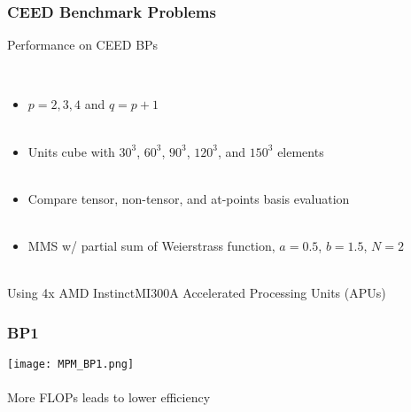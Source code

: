 \documentclass{beamer}
\begin{document}
\begin{frame}
\begin{center}
\frametitle{CEED Benchmark Problems}

Performance on CEED BPs

~\\

\begin{itemize}

\item $p = 2, 3, 4$ and $q = p + 1$\\

~\\

\item Units cube with $30^3$, $60^3$, $90^3$, $120^3$, and $150^3$ elements\\

~\\

\item Compare tensor, non-tensor, and at-points basis evaluation\\

~\\

\item MMS w/ partial sum of Weierstrass function, $a = 0.5$, $b = 1.5$, $N = 2$\\

\end{itemize}

~\\

Using 4x AMD Instinct\texttrademark MI300A Accelerated Processing Units (APUs)

\end{center}
\end{frame}


\begin{frame}
\begin{center}
\frametitle{BP1}

\texttt{[image: MPM\_BP1.png]}\\

~\\

More FLOPs leads to lower efficiency

\end{center}
\end{frame}

\end{document}
